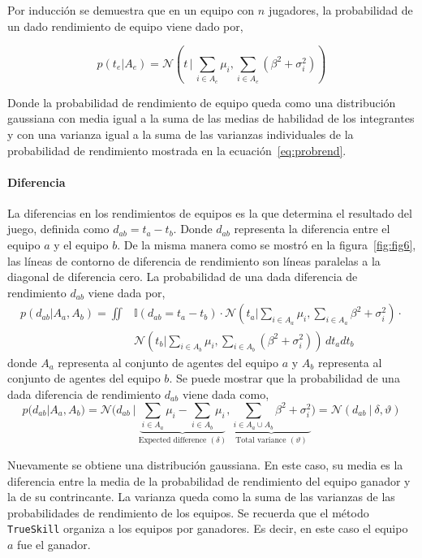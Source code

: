 \documentclass[11pt,twoside,spanish]{report} %
\begin{document}
Por inducci\'on se demuestra que en un equipo con $n$ jugadores, la probabilidad de un dado rendimiento de equipo viene dado por,

\begin{equation}
p(t_e|A_e) = \mathcal{N}\left(t\,|\,\sum_{i\in A_e} \mu_i,\sum_{i\in A_e} (\beta^2 + \sigma_i^2)\right)
\end{equation}

Donde la probabilidad de rendimiento de equipo queda como una distribuci\'on gaussiana con media igual a la suma de las medias de habilidad de los integrantes y con una varianza igual a la suma de las varianzas individuales de la probabilidad de rendimiento mostrada en la ecuaci\'on~\ref{eq:probrend}.


\paragraph{Diferencia}

La diferencias en los rendimientos de equipos es la que determina el resultado del juego, definida como $d_{ab}=t_a - t_b$.
Donde $d_{ab}$ representa la diferencia entre el equipo $a$ y el equipo $b$.
De la misma manera como se mostr\'o en la figura~\ref{fig:fig6}, las l\'ineas de contorno de diferencia de rendimiento son l\'ineas paralelas a la diagonal de diferencia cero.
La probabilidad de una dada diferencia de rendimiento $d_ {ab}$ viene dada por,
\begin{align}\label{eq:mensajeCum}
p(d_{ab}|A_a,A_b) = \iint & \mathbb{I}(d_{ab}=t_a -t_b)\cdot \mathcal{N}(t_a|\sum_{i\in A_a} \mu_i,\sum_{i\in A_a} \beta^2 + \sigma_i^2) \cdot \nonumber \\
& \mathcal{N}(t_b|\sum_{i\in A_b} \mu_i,\sum_{i\in A_b} (\beta^2 + \sigma_i^2)) \, dt_a dt_b
\end{align}
donde $A_a$ representa al conjunto de agentes del equipo $a$ y $A_b$ representa al conjunto de agentes del equipo $b$.
Se puede mostrar que la probabilidad de una dada diferencia de rendimiento $d_ {ab}$ viene dada como,
\begin{equation}\label{eq:proba_handicap}
p(d_{ab}|A_a,A_b) = \mathcal{N}\Bigg(d_{ab} \ | \  \underbrace{\sum_{i\in A_a} \mu_i - \sum_{i\in A_b} \mu_i}_{\text{Expected difference }(\delta)},\underbrace{\sum_{i\in A_a\cup A_b} \beta^2 + \sigma_i^2}_{\text{Total variance }(\vartheta)}\Bigg) = \mathcal{N}(d_{ab} \ | \  \delta, \vartheta )
\end{equation}

Nuevamente se obtiene una distribuci\'on gaussiana.
En este caso, su media es la diferencia entre la media de la probabilidad de rendimiento del equipo ganador y la de su contrincante. 
La varianza queda como la suma de las varianzas de las probabilidades de rendimiento de los equipos.
Se recuerda que el m\'etodo \texttt{TrueSkill} organiza a los equipos por ganadores.
Es decir, en este caso el equipo $a$ fue el ganador.
\end{document}
